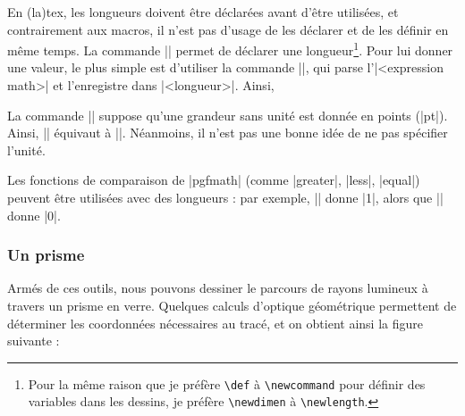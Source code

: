 \documentclass[a4paper]{ltxdoc}
\begin{document}
En (la)tex, les longueurs doivent être déclarées avant d'être utilisées, et contrairement aux macros, il n'est pas d'usage de les déclarer et de les définir en même temps. La commande || permet de déclarer une longueur\footnote{Pour la même raison que je préfère \texttt{\textbackslash{}def} à \texttt{\textbackslash{}newcommand} pour définir des variables dans les dessins, je préfère \texttt{\textbackslash{}newdimen} à \texttt{\textbackslash{}newlength}.}. Pour lui donner une valeur, le plus simple est d'utiliser la commande ||, qui parse l'|<expression math>| et l'enregistre dans |<longueur>|. Ainsi,

\begin{codeexample}[]
\end{codeexample}

La commande |\pgfmathsetlength| suppose qu'une grandeur sans unité est donnée en points (|pt|). Ainsi, |\pgfmathsetlength{}| équivaut à |\pgfmathsetlength\hauteurFente{3pt}|. Néanmoins, il n'est pas une bonne idée de ne pas spécifier l'unité.

Les fonctions de comparaison de |pgfmath| (comme |greater|, |less|, |equal|) peuvent être utilisées avec des longueurs : par exemple, |\pgfmathparse{2cm <= 4cm}| donne |1|, alors que |\pgfmathparse{2cm <= 4pt}| donne |0|.

\subsubsection{Un prisme}

Armés de ces outils, nous pouvons dessiner le parcours de rayons lumineux à travers un prisme en verre. Quelques calculs d'optique géométrique permettent de déterminer les coordonnées nécessaires au tracé, et on obtient ainsi la figure suivante :
\end{document}
